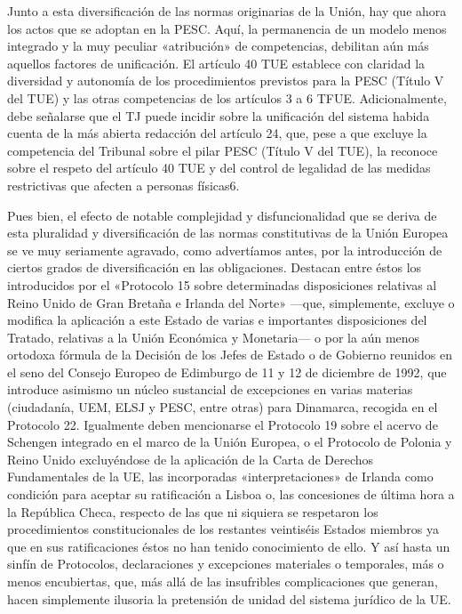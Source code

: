 \documentclass[10pt,a4paper]{article}
\begin{document}
Junto a esta diversificación de las normas originarias de la Unión, hay que ahora los actos que se adoptan en la PESC. Aquí, la permanencia de un modelo menos integrado y la muy peculiar «atribución» de competencias, debilitan aún más aquellos factores de unificación. El artículo 40 TUE establece con claridad la diversidad y autonomía de los procedimientos previstos para la PESC (Título V del TUE) y las otras competencias de los artículos 3 a 6 TFUE. Adicionalmente, debe señalarse que el TJ puede incidir sobre la unificación del sistema habida cuenta de la más abierta redacción del artículo 24, que, pese a que excluye la competencia del Tribunal sobre el pilar PESC (Título V del TUE), la reconoce sobre el respeto del artículo 40 TUE y del control de legalidad de las medidas restrictivas que afecten a personas físicas6.

Pues bien, el efecto de notable complejidad y disfuncionalidad que se deriva de esta pluralidad y diversificación de las normas constitutivas de la Unión Europea se ve muy seriamente agravado, como advertíamos antes, por la introducción de ciertos grados de diversificación en las obligaciones. Destacan entre éstos los introducidos por el «Protocolo 15 sobre determinadas disposiciones relativas al Reino Unido de Gran Bretaña e Irlanda del Norte» —que, simplemente, excluye o modifica la aplicación a este Estado de varias e importantes disposiciones del Tratado, relativas a la Unión Económica y Monetaria— o por la aún menos ortodoxa fórmula de la Decisión de los Jefes de Estado o de Gobierno reunidos en el seno del Consejo Europeo de Edimburgo de 11 y 12 de diciembre de 1992, que introduce asimismo un núcleo sustancial de excepciones en varias materias (ciudadanía, UEM, ELSJ y PESC, entre otras) para Dinamarca, recogida en el Protocolo 22. Igualmente deben mencionarse el Protocolo 19 sobre el acervo de Schengen integrado en el marco de la Unión Europea, o el Protocolo de Polonia y Reino Unido excluyéndose de la aplicación de la Carta de Derechos Fundamentales de la UE, las incorporadas «interpretaciones» de Irlanda como condición para aceptar su ratificación a Lisboa o, las concesiones de última hora a la República Checa, respecto de las que ni siquiera se respetaron los procedimientos constitucionales de los restantes veintiséis Estados miembros ya que en sus ratificaciones éstos no han tenido conocimiento de ello. Y así hasta un sinfín de Protocolos, declaraciones y excepciones materiales o temporales, más o menos encubiertas, que, más allá de las insufribles complicaciones que generan, hacen simplemente ilusoria la pretensión de unidad del sistema jurídico de la UE.
\end{document}

